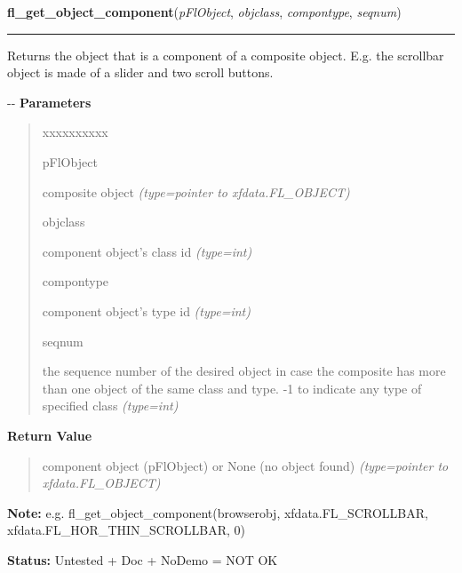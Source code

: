\hspace{.8\funcindent}\begin{boxedminipage}{\funcwidth}

    \raggedright \textbf{fl\_get\_object\_component}(\textit{pFlObject}, \textit{objclass}, \textit{compontype}, \textit{seqnum})

    \vspace{-1.5ex}

    \rule{\textwidth}{0.5\fboxrule}
\setlength{\parskip}{2ex}

Returns the object that is a component of a composite object. E.g. the
scrollbar object is made of a slider and two scroll buttons.

-{}-
\setlength{\parskip}{1ex}
      \textbf{Parameters}
      \vspace{-1ex}

      \begin{quote}
        \begin{Ventry}{xxxxxxxxxx}

          \item[pFlObject]


composite object
            {\it (type=pointer to xfdata.FL\_OBJECT)}

          \item[objclass]


component object's class id
            {\it (type=int)}

          \item[compontype]


component object's type id
            {\it (type=int)}

          \item[seqnum]


the sequence number of the desired object in case the composite has
more than one object of the same class and type. -1 to indicate any
type of specified class
            {\it (type=int)}

        \end{Ventry}

      \end{quote}

      \textbf{Return Value}
    \vspace{-1ex}

      \begin{quote}

component object (pFlObject) or None (no object found)
      {\it (type=pointer to xfdata.FL\_OBJECT)}

      \end{quote}

\textbf{Note:} 
e.g. fl\_get\_object\_component(browserobj, xfdata.FL\_SCROLLBAR,
xfdata.FL\_HOR\_THIN\_SCROLLBAR, 0)


\textbf{Status:} 
Untested + Doc + NoDemo = NOT OK


    \end{boxedminipage}

